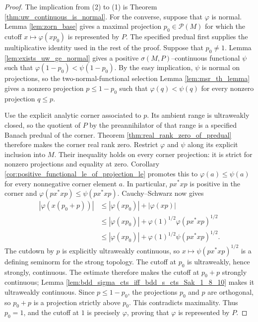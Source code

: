 \begin{proof}
  \leanok
  The implication from (2) to (1) is Theorem \ref{thm:uw_continuous_is_normal}. For the converse,
  suppose that $\varphi$ is normal. Lemma \ref{lem:zorn_base} gives a maximal projection
  $p_0\in\mathcal{P}(M)$ for which the cutoff $x\mapsto\varphi(xp_0)$ is represented by $P$.
  The specified predual first supplies the multiplicative identity used in the rest of the proof.
  Suppose that $p_0\ne1$. Lemma \ref{lem:exists_uw_ge_normal} gives a positive
  $\sigma(M,P)$--continuous functional $\psi$ such that
  $\varphi(1-p_0)<\psi(1-p_0)$. By the easy implication, $\psi$ is normal on projections, so the
  two-normal-functional selection Lemma \ref{lem:msr_th_lemma} gives a nonzero projection
  $p\le1-p_0$ such that $\varphi(q)<\psi(q)$ for every nonzero projection $q\le p$.

  Use the explicit analytic corner associated to $p$. Its ambient range is ultraweakly closed, so
  the quotient of $P$ by the preannihilator of that range is a specified Banach predual of the
  corner. Theorem \ref{thm:real_rank_zero_of_predual} therefore makes the corner real rank zero.
  Restrict $\varphi$ and $\psi$ along its explicit inclusion into $M$. Their inequality holds on
  every corner projection: it is strict for nonzero projections and equality at zero. Corollary
  \ref{cor:positive_functional_le_of_projection_le} promotes this to
  $\varphi(a)\le\psi(a)$ for every nonnegative corner element $a$. In particular,
  $px^{*}xp$ is positive in the corner and
  $\varphi(px^{*}xp)\le\psi(px^{*}xp)$. Cauchy--Schwarz now gives
  \begin{align}
    |\varphi(x(p_0+p))|&\le |\varphi(xp_0)|+|\varphi(xp)|\\ \nonumber
    &\le |\varphi(xp_0)|+\varphi(1)^{1/2}\varphi(px^{*}xp)^{1/2}\\ \nonumber
    &\le |\varphi(xp_0)|+\varphi(1)^{1/2}\psi(px^{*}xp)^{1/2}.
  \end{align}
  The cutdown by $p$ is explicitly ultraweakly continuous, so
  $x\mapsto\psi(px^{*}xp)^{1/2}$ is a defining seminorm for the strong topology. The cutoff at
  $p_0$ is ultraweakly, hence strongly, continuous. The estimate therefore makes the cutoff at
  $p_0+p$ strongly continuous; Lemma
  \ref{lem:bdd_sigma_cts_iff_bdd_s_cts_Sak_1_8_10} makes it ultraweakly continuous. Since
  $p\le1-p_0$, the projections $p_0$ and $p$ are orthogonal, so $p_0+p$ is a projection strictly
  above $p_0$. This contradicts maximality. Thus $p_0=1$, and the cutoff at $1$ is precisely
  $\varphi$, proving that $\varphi$ is represented by $P$.
\end{proof}

